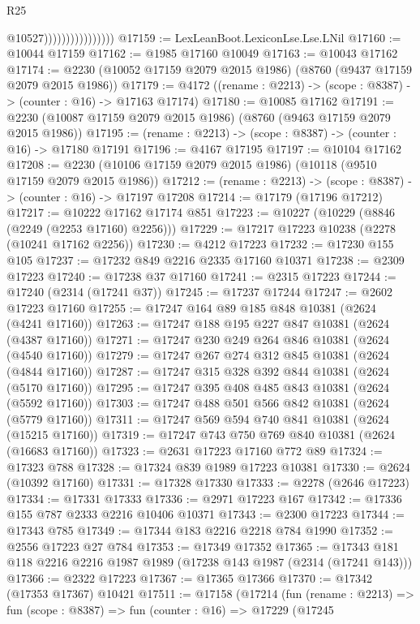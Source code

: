 \begin{lexlean}{R25}
\begin{coremodule}
                                    @10527))))))))))))))))
@17159 := LexLeanBoot.LexiconLse.Lse.LNil
@17160 := @10044 @17159
@17162 := @1985 @17160 @10049
@17163 := @10043 @17162
@17174 := @2230 (@10052 @17159 @2079 @2015 @1986) (@8760 (@9437 @17159 @2079 @2015 @1986))
@17179 := @4172 ((rename : @2213) -> (scope : @8387) -> (counter : @16) -> @17163 @17174)
@17180 := @10085 @17162
@17191 := @2230 (@10087 @17159 @2079 @2015 @1986) (@8760 (@9463 @17159 @2079 @2015 @1986))
@17195 := (rename : @2213) -> (scope : @8387) -> (counter : @16) -> @17180 @17191
@17196 := @4167 @17195
@17197 := @10104 @17162
@17208 := @2230 (@10106 @17159 @2079 @2015 @1986) (@10118 (@9510 @17159 @2079 @2015 @1986))
@17212 := (rename : @2213) -> (scope : @8387) -> (counter : @16) -> @17197 @17208
@17214 := @17179 (@17196 @17212)
@17217 := @10222 @17162 @17174 @851
@17223 := @10227 (@10229 (@8846 (@2249 (@2253 @17160) @2256)))
@17229 := @17217 @17223 @10238 (@2278 (@10241 @17162 @2256))
@17230 := @4212 @17223
@17232 := @17230 @155 @105
@17237 := @17232 @849 @2216 @2335 @17160 @10371
@17238 := @2309 @17223
@17240 := @17238 @37 @17160
@17241 := @2315 @17223
@17244 := @17240 (@2314 (@17241 @37))
@17245 := @17237 @17244
@17247 := @2602 @17223 @17160
@17255 := @17247 @164 @89 @185 @848 @10381 (@2624 (@4241 @17160))
@17263 := @17247 @188 @195 @227 @847 @10381 (@2624 (@4387 @17160))
@17271 := @17247 @230 @249 @264 @846 @10381 (@2624 (@4540 @17160))
@17279 := @17247 @267 @274 @312 @845 @10381 (@2624 (@4844 @17160))
@17287 := @17247 @315 @328 @392 @844 @10381 (@2624 (@5170 @17160))
@17295 := @17247 @395 @408 @485 @843 @10381 (@2624 (@5592 @17160))
@17303 := @17247 @488 @501 @566 @842 @10381 (@2624 (@5779 @17160))
@17311 := @17247 @569 @594 @740 @841 @10381 (@2624 (@15215 @17160))
@17319 := @17247 @743 @750 @769 @840 @10381 (@2624 (@16683 @17160))
@17323 := @2631 @17223 @17160 @772 @89
@17324 := @17323 @788
@17328 := @17324 @839 @1989 @17223 @10381
@17330 := @2624 (@10392 @17160)
@17331 := @17328 @17330
@17333 := @2278 (@2646 @17223)
@17334 := @17331 @17333
@17336 := @2971 @17223 @167
@17342 := @17336 @155 @787 @2333 @2216 @10406 @10371
@17343 := @2300 @17223
@17344 := @17343 @785
@17349 := @17344 @183 @2216 @2218 @784 @1990
@17352 := @2556 @17223 @27 @784
@17353 := @17349 @17352
@17365 := @17343 @181 @118 @2216 @2216 @1987 @1989 (@17238 @143 @1987 (@2314 (@17241 @143)))
@17366 := @2322 @17223
@17367 := @17365 @17366
@17370 := @17342 (@17353 @17367) @10421
@17511 := @17158
    (@17214
      (fun (rename : @2213) =>
      fun (scope : @8387) =>
      fun (counter : @16) =>
      @17229
        (@17245

\end{coremodule}
\end{lexlean}
